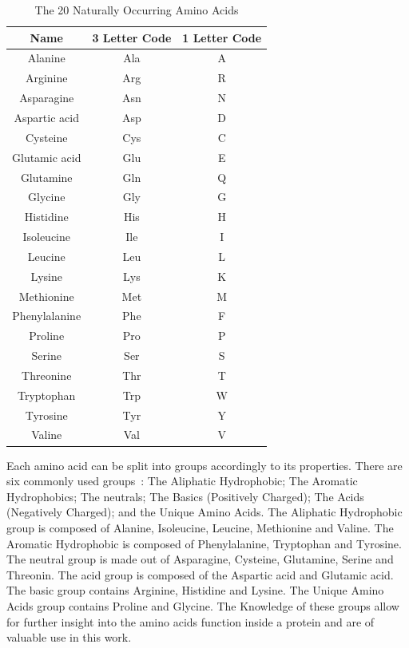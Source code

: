 \begin{table}[h]
    \centering
    \begin{tabular}{c|c|c} \hline \hline
        Name          & 3 Letter Code & 1 Letter Code \\ \hline \hline
        Alanine       & Ala  & A \\
        Arginine      & Arg  & R \\
        Asparagine    & Asn  & N \\
        Aspartic acid & Asp  & D \\
        Cysteine      & Cys  & C \\
        Glutamic acid & Glu  & E \\
        Glutamine     & Gln  & Q \\
        Glycine       & Gly  & G \\
        Histidine     & His  & H \\
        Isoleucine    & Ile  & I \\
        Leucine       & Leu  & L \\
        Lysine        & Lys  & K \\
        Methionine    & Met  & M \\
        Phenylalanine & Phe  & F \\
        Proline       & Pro  & P \\
        Serine        & Ser  & S \\
        Threonine     & Thr  & T \\
        Tryptophan    & Trp  & W \\
        Tyrosine      & Tyr  & Y \\
        Valine        & Val  & V \\ \hline \hline
    \end{tabular}
    \caption{The 20 Naturally Occurring Amino Acids}
    \label{tab:amino-acids}
\end{table}

Each amino acid can be split into groups accordingly to its properties.
There are six commonly used groups~\cite{garrett1999biochemistry}:
The Aliphatic Hydrophobic; The Aromatic Hydrophobics; The neutrals; The Basics (Positively Charged); The Acids (Negatively Charged); and the Unique Amino Acids. The Aliphatic Hydrophobic group is composed of Alanine, Isoleucine, Leucine, Methionine and Valine. The Aromatic Hydrophobic is composed of Phenylalanine, Tryptophan and Tyrosine. The neutral group is made out of Asparagine, Cysteine, Glutamine, Serine and Threonin. The acid group is composed of the Aspartic acid and Glutamic acid. The basic group contains Arginine, Histidine and Lysine. The Unique Amino Acids group contains Proline and Glycine. The Knowledge of these groups allow for further insight into the amino acids function inside a protein and are of valuable use in this work.


